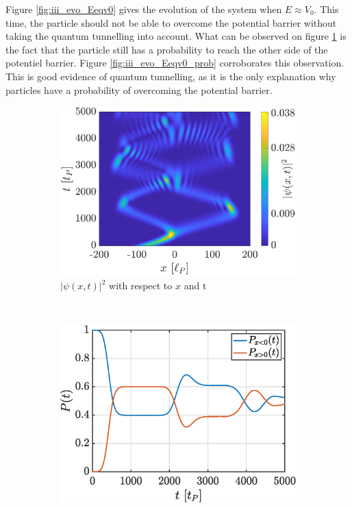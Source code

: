 \documentclass[a4paper,12pt,twoside]{article}
\begin{document}
    Figure \ref{fig:iii_evo_Eeqv0} gives the evolution of the system when $E \approx V_0$.
    This time, the particle should not be able to overcome the potential barrier without taking the quantum tunnelling into account.
    What can be observed on figure \ref{fig:iii_evo_Eeqv0_evo} is the fact that the particle still has a probability to reach the other side of the potentiel barrier.
    Figure \ref{fig:iii_evo_Eeqv0_prob} corroborates this observation.
    This is good evidence of quantum tunnelling, as it is the only explanation why particles have a probability of overcoming the potential barrier.\\


    \begin{figure}[h]
      \centering
      \begin{subfigure}[t]{0.45\textwidth}
        \includegraphics[width=\textwidth]{graphs/iii_evo_Eeqv0_evo.eps}
        \caption{$|\psi(x, t)|^2$ with respect to $x$ and t}
        \label{fig:iii_evo_Eeqv0_evo}
      \end{subfigure}
      ~
      \begin{subfigure}[t]{0.45\textwidth}
        \includegraphics[width=\textwidth]{graphs/iii_evo_Eeqv0_prob.eps}

\end{subfigure}
\end{figure}
\end{document}
